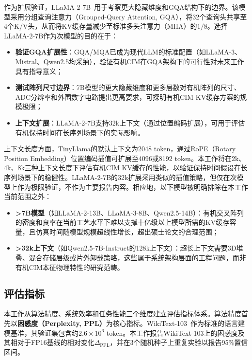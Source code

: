 作为扩展验证，LLaMA-2-7B~\cite{touvron2023llama2}用于考察更大隐藏维度和GQA结构下的边界。该模型采用分组查询注意力（Grouped-Query Attention, GQA），将32个查询头共享至4个K/V头，从而将KV缓存量减少至标准多头注意力（MHA）的$1/8$。选择LLaMA-2-7B作为次模型的目的在于：

\begin{itemize}
    \item \textbf{验证GQA扩展性}：GQA/MQA已成为现代LLM的标准配置（如LLaMA-3、Mistral、Qwen2.5均采纳），验证有机CIM在GQA架构下的可行性对未来工作具有指导意义；
    \item \textbf{测试阵列尺寸边界}：7B模型的更大隐藏维度和更多层数对有机阵列的尺寸、ADC分辨率和外围数字电路提出更高要求，可探明有机CIM KV缓存方案的规模极限；
    \item \textbf{上下文扩展}：LLaMA-2-7B支持32k上下文（通过位置编码扩展），可用于评估有机保持时间在长序列场景下的实际影响。
\end{itemize}

上下文长度方面，TinyLlama的默认上下文为2048 token，通过RoPE（Rotary Position Embedding）位置编码插值可扩展至4096或8192 token。本工作将在2k、4k、8k三种上下文长度下评估有机CIM KV缓存的性能，以验证保持时间假设在长序列场景下的稳健性。LLaMA-2-7B的32k扩展采用类似的插值策略，但仅在次模型上作为极限验证，不作为主要报告内容。相应地，以下模型被明确排除在本工作当前范围之外：

\begin{itemize}
    \item \textbf{>7B模型}（如LLaMA-2-13B、LLaMA-3-8B、Qwen2.5-14B）：有机交叉阵列的密度和良率在当前工艺水平下难以支撑十亿级以上模型所需的KV缓存容量，且仿真时间随模型规模超线性增长，超出硕士论文的合理范围；
    \item \textbf{>32k上下文}（如Qwen2.5-7B-Instruct的128k上下文）：超长上下文需要3D堆叠、混合存储层级或片外卸载策略，这些属于系统架构层面的工程问题，而非有机CIM本征物理特性的研究范畴。
\end{itemize}

\subsection{评估指标}

本工作从算法精度、系统效率和任务性能三个维度建立评估指标体系。算法精度首先以\textbf{困惑度（Perplexity, PPL）}为核心指标。WikiText-103~\cite{merity2016pointer}作为标准的语言建模基准，其验证集包含约$2.6 \times 10^6$ token。本工作报告WikiText-103上的困惑度及其相对于FP16基线的相对变化$\Delta_{\text{PPL}}$，并在3个随机种子上重复实验以报告95\%置信区间。

